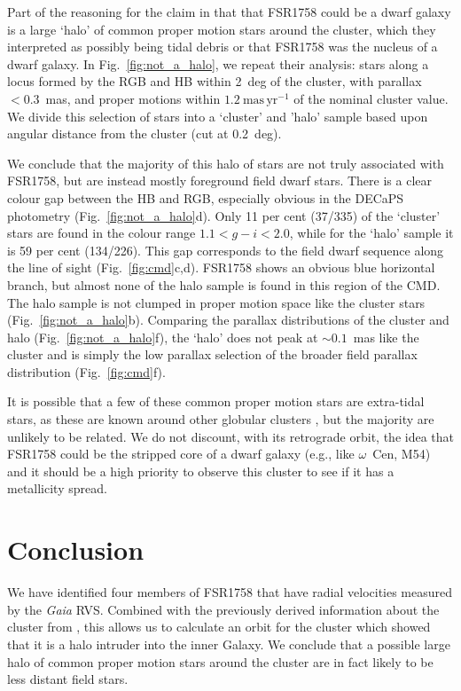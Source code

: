 \documentclass[fleqn,usenatbib]{mnras}
\newcommand{\masyr}{~\ensuremath{\textrm{mas}\,\textrm{yr}^{-1}}}
\begin{document}
Part of the reasoning for the claim in  that that FSR1758 could be a dwarf galaxy is a large `halo' of common proper motion stars around the cluster, which they interpreted as possibly being tidal debris or that FSR1758 was the nucleus of a dwarf galaxy. In Fig.\ \ref{fig:not_a_halo}, we repeat their analysis: stars along a locus formed by the RGB and HB within 2~deg of the cluster, with parallax $<0.3$~mas, and proper motions within $1.2\masyr$ of the nominal cluster value. We divide this selection of stars into a `cluster' and 'halo' sample based upon angular distance from the cluster (cut at 0.2~deg).

We conclude that the majority of this halo of stars are not truly associated with FSR1758, but are instead mostly foreground field dwarf stars. There is a clear colour gap between the HB and RGB, especially obvious in the DECaPS photometry (Fig.\ \ref{fig:not_a_halo}d). Only 11 per cent (37/335) of the `cluster' stars are found in the colour range $1.1<g-i<2.0$,  while for the `halo' sample it is 59 per cent (134/226). This gap corresponds to the field dwarf sequence along the line of sight (Fig.\ \ref{fig:cmd}c,d). FSR1758 shows an obvious blue horizontal branch, but almost none of the halo sample is found in this region of the CMD. The halo sample is not clumped in proper motion space like the cluster stars (Fig.\ \ref{fig:not_a_halo}b). Comparing the parallax distributions of the cluster and halo (Fig.\ \ref{fig:not_a_halo}f), the `halo' does not peak at $\sim0.1$~mas like the cluster and is simply the low parallax selection of the broader field parallax distribution (Fig.\ \ref{fig:cmd}f).

It is possible that a few of these common proper motion stars are extra-tidal stars, as these are known around other globular clusters \citep[e.g.,][]{Simpson:2017be}, but the majority are unlikely to be related. We do not discount, with its retrograde orbit, the idea that FSR1758 could be the stripped core of a dwarf galaxy (e.g., like $\omega$~Cen, M54) and it should be a high priority to observe this cluster to see if it has a metallicity spread.

\section{Conclusion}
We have identified four members of FSR1758 that have radial velocities measured by the \textit{Gaia} RVS. Combined with the previously derived information about the cluster from , this allows us to calculate an orbit for the cluster which showed that it is a halo intruder into the inner Galaxy. We conclude that a possible large halo of common proper motion stars around the cluster are in fact likely to be less distant field stars. 
\end{document}
